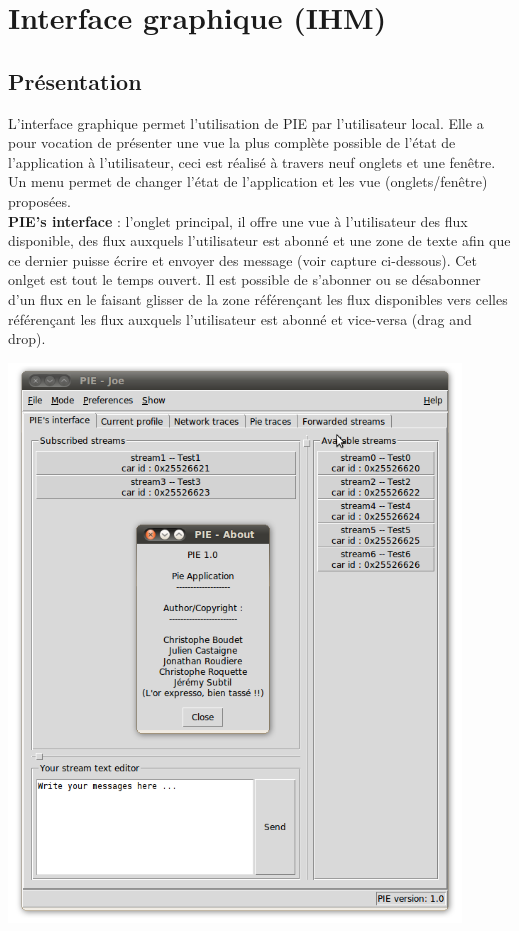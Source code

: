 
\section{Interface graphique (IHM)}
\label{section:ihm}

\subsection{Présentation}

L'interface graphique permet l'utilisation de PIE par l'utilisateur local. Elle a pour vocation
de présenter une vue la plus complète possible de l'état de l'application à l'utilisateur, ceci
est réalisé à travers neuf onglets et une fenêtre. Un menu permet de changer l'état de l'application
et les vue (onglets/fenêtre) proposées. \\

\textbf{PIE's interface} : l'onglet principal, il offre une vue à l'utilisateur des flux disponible,
des flux auxquels l'utilisateur est abonné et une zone de texte afin que ce dernier puisse écrire et
envoyer des message (voir capture ci-dessous). Cet onlget est tout le temps ouvert. Il est possible
de s'abonner ou se désabonner d'un flux en le faisant glisser de la zone référençant les flux disponibles
vers celles référençant les flux auxquels l'utilisateur est abonné et vice-versa (drag and drop).\\

\begin{center}
    \includegraphics[width=0.9\textwidth]{img/pie-main.png}
\end{center}


